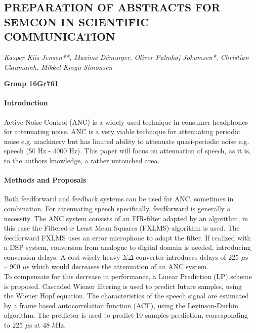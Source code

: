 \documentclass[a4paper]{article}
\title{}
\begin{document}
	
	{\centering
		\subsection*{PREPARATION OF ABSTRACTS FOR SEMCON IN SCIENTIFIC COMMUNICATION}}
	
	{\centering
		\textit{Kasper Kiis Jensen**, Maxime Démurger, Oliver Palmhøj Jokumsen*, Christian Claumarch, Mikkel Krogn Simonsen}
		\par}
	{\centering
		\textbf{Group 16Gr761}
		\par}
	
	
	\bigskip
	
	\paragraph{Introduction}
	Active Noise Control (ANC) is a widely used technique in consumer headphones for attenuating noise. ANC is a very viable technique for attenuating periodic noise e.g. machinery but has limited ability to attenuate quasi-periodic noise e.g. speech (50 Hz - 4000 Hz). This paper will focus on attenuation of speech, as it is, to the authors knowledge, a rather untouched area. 
	
	\paragraph{Methods and Proposals}
	Both feedforward and feedback systems can be used for ANC, sometimes in combination. For attenuating speech specifically, feedforward is generally a necessity. The ANC system consists of an FIR-filter adapted by an algorithm, in this case the Filtered-$x$ Least Mean Squares (FXLMS)-algorithm is used. The feedforward FXLMS uses an error microphone to adapt the filter. 
	If realized with a DSP system, conversion from analogue to digital domain is needed, introducing conversion delays. A cost-wisely heavy $\Sigma\Delta$-converter introduces delays of 225 $\mu$s -- 900 $\mu$s which would decreases the attenuation of an ANC system. \\
	To compensate for this decrease in performance, a Linear Prediction (LP) scheme is proposed.
	Cascaded Wiener filtering is used to predict future samples, using the Wiener Hopf equation. The characteristics of the speech signal are estimated by a frame based autocorrelation function (ACF), using the Levinson-Durbin algorithm. The predictor is used to predict 10 samples prediction, corresponding to 225 $\mu$s at 48 $k$Hz.
	
\end{document}
